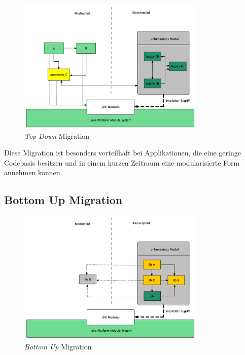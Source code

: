 	\begin{figure}[h]
		\centering
	    \includegraphics[width=0.8\textwidth]{material/images/top-down-migration.png}
	    \caption{\textit{Top Down} Migration}
	    \label{fig:TDM}
  	\end{figure}

	Diese Migration ist besonders vorteilhaft bei Applikationen, die eine geringe Codebasis besitzen und in einem kurzen Zeitraum eine modularisierte Form annehmen können. 

\subsection{Bottom Up Migration} \label{sec:bottomUP}
	\begin{figure}[h]
		\centering
	    \includegraphics[width=0.8\textwidth]{material/images/bottom-up-migration.png}
	    \caption{\textit{Bottom Up} Migration \cite{modulMitJava9}}
	    \label{fig:BUM}
  	\end{figure}

